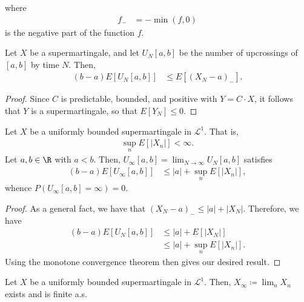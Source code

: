 \documentclass[10pt]{mypackage}
\renewcommand{\coloneq}{\coloneqq}
\begin{document}
where 
\begin{align*}
  f_{-} &= -\min\left( f,0 \right)
\end{align*}
is the negative part of the function $f$.
\begin{lemma}
  Let $X$ be a supermartingale, and let $U_N[a,b]$ be the number of upcrossings of $[a,b]$ by time $N$. Then,
  \begin{align*}
    \left( b-a \right)E\left[ U_N[a,b] \right] &\leq E\left[ \left( X_{N}-a \right)_{-} \right].
  \end{align*}
\end{lemma}
\begin{proof}
  Since $C$ is predictable, bounded, and positive with $Y = C\cdot X$, it follows that $Y$ is a supermartingale, so that $E\left[ Y_N \right]\leq 0$.
\end{proof}
\begin{corollary}
  Let $X$ be a uniformly bounded supermartingale in $\mathcal{L}^1$. That is,
  \begin{align*}
    \sup_{n} E\left[ \left\vert X_n \right\vert \right] < \infty.
  \end{align*}
  Let $a,b\in \R$ with $a < b$. Then, $U_{\infty}\left[ a,b \right] = \lim_{N\to\infty} U_N\left[ a,b \right]$ satisfies
  \begin{align*}
    \left( b-a \right)E\left[ U_{\infty}\left[ a,b \right] \right] &\leq \left\vert a \right\vert + \sup_{n} E\left[ \left\vert X_n \right\vert \right],
  \end{align*}
  whence $P\left( U_{\infty}\left[ a,b \right] = \infty \right) = 0$.
\end{corollary}
\begin{proof}
  As a general fact, we have that $\left( X_N-a \right)_{-}\leq \left\vert a \right\vert + \left\vert X_N \right\vert$. Therefore, we have
  \begin{align*}
    \left( b-a \right)E\left[ U_N\left[ a,b \right] \right] &\leq \left\vert a \right\vert + E\left[ \left\vert X_N \right\vert \right]\\
                                                            &\leq \left\vert a \right\vert + \sup_{n}E\left[ \left\vert X_n \right\vert \right].
  \end{align*}
  Using the monotone convergence theorem then gives our desired result.
\end{proof}
\begin{theorem}
  Let $X$ be a uniformly bounded supermartingale in $\mathcal{L}^1$. Then, $X_{\infty}\coloneq \lim_{n}X_n$ exists and is finite a.s.
\end{theorem}
\end{document}
